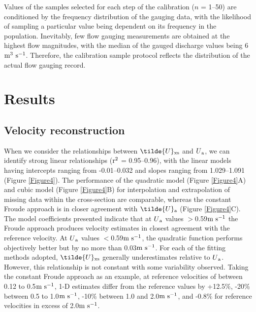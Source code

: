 \documentclass[hess, manuscript]{copernicus} %
\begin{document}
Values of the samples selected for each step of the calibration ($n$ = 1--50) are conditioned by the frequency distribution of the gauging data, with the likelihood of sampling a particular value being dependent on its frequency in the population. Inevitably, few flow gauging measurements are obtained at the highest flow magnitudes, with the median of the gauged discharge values being 6 $\textnormal{m\textsuperscript{3} s\textsuperscript{-1}}$. Therefore, the calibration sample protocol reflects the distribution of the actual flow gauging record.

\section{Results}

\subsection{Velocity reconstruction}

When we consider the relationships between $\tilde{U}\textsubscript{xs}$ and $U\textsubscript{a}$, we can identify strong linear relationships ($\textnormal{r\textsuperscript{2}}$ = 0.95--0.96), with the linear models having intercepts ranging from -0.01--0.032 and slopes ranging from 1.029--1.091 (Figure \ref{Figure4}). The performance of the quadratic model (Figure \ref{Figure4}A) and cubic model (Figure \ref{Figure4}B) for interpolation and extrapolation of missing data within the cross-section are comparable, whereas the constant Froude approach is in closer agreement with $\tilde{U}\textsubscript{a}$ (Figure \ref{Figure4}C). The model coefficients presented indicate that at $U\textsubscript{a}$ values $>$0.59$\textnormal{m s\textsuperscript{-1}}$ the Froude approach produces velocity estimates in closest agreement with the reference velocity. At $U\textsubscript{a}$ values $<$0.59$\textnormal{m s\textsuperscript{-1}}$, the quadratic function performs objectively better but by no more than 0.03$\textnormal{m s\textsuperscript{-1}}$. For each of the fitting methods adopted, $\tilde{U}\textsubscript{xs}$ generally underestimates relative to $U\textsubscript{a}$. However, this relationship is not constant with some variability observed. Taking the constant Froude approach as an example, at reference velocities of between 0.12 to 0.5$\textnormal{m s\textsuperscript{-1}}$, 1-D estimates differ from the reference values by +12.5\%, -20\% between 0.5 to 1.0$\textnormal{m s\textsuperscript{-1}}$, -10\% between 1.0 and 2.0$\textnormal{m s\textsuperscript{-1}}$, and -0.8\% for reference velocities in excess of 2.0$\textnormal{m s\textsuperscript{-1}}$.
\end{document}
